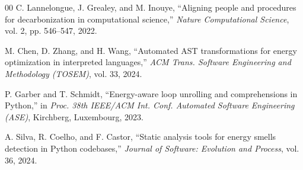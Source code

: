 \documentclass[conference]{IEEEtran}
\begin{document}
\begin{thebibliography}{00}
C. Lannelongue, J. Grealey, and M. Inouye, ``Aligning people and procedures
for decarbonization in computational science,'' \textit{Nature Computational
Science}, vol. 2, pp. 546--547, 2022.

M. Chen, D. Zhang, and H. Wang, ``Automated AST transformations for energy
optimization in interpreted languages,'' \textit{ACM Trans. Software
Engineering and Methodology (TOSEM)}, vol. 33, 2024.

P. Garber and T. Schmidt, ``Energy-aware loop unrolling and comprehensions in
Python,'' in \textit{Proc. 38th IEEE/ACM Int. Conf. Automated Software
Engineering (ASE)}, Kirchberg, Luxembourg, 2023.

A. Silva, R. Coelho, and F. Castor, ``Static analysis tools for energy smells
detection in Python codebases,'' \textit{Journal of Software: Evolution and
Process}, vol. 36, 2024.

\end{thebibliography}
\end{document}
